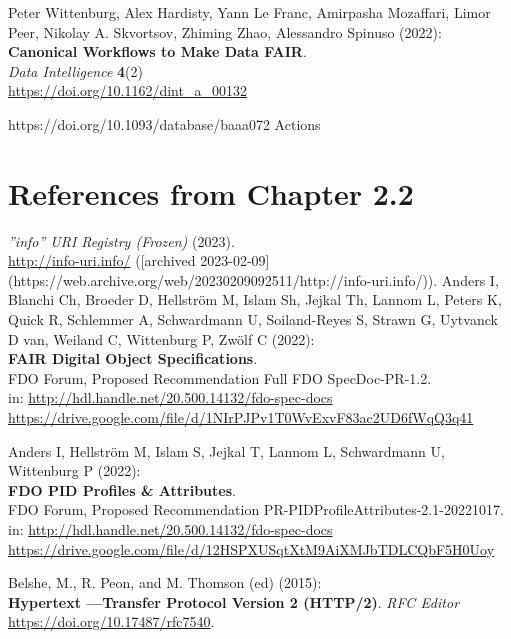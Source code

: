 \begin{thebibliography}{9}
Peter Wittenburg, Alex Hardisty, Yann Le Franc, Amirpasha Mozaffari, Limor Peer, Nikolay A. Skvortsov, Zhiming Zhao, Alessandro Spinuso (2022):\\
\textbf{Canonical Workflows to Make Data FAIR}.\\
\emph{Data Intelligence} \textbf{4}(2)\\
\url{https://doi.org/10.1162/dint_a_00132}


https://doi.org/10.1093/database/baaa072 Actions







\section{References from Chapter 2.2}

\emph{”info” URI Registry (Frozen)} (2023).  \\
\url{http://info-uri.info/} ([archived 2023-02-09](https://web.archive.org/web/20230209092511/http://info-uri.info/)).
{}
Anders I, Blanchi Ch, Broeder D, Hellström M, Islam Sh, Jejkal Th, Lannom L, Peters K, Quick R, Schlemmer A, Schwardmann U, Soiland-Reyes S, Strawn G, Uytvanck D van, Weiland C, Wittenburg P, Zwölf C (2022):\\
\textbf{FAIR Digital Object Specifications}.\\
FDO Forum, Proposed Recommendation Full FDO SpecDoc-PR-1.2. \\
in: \url{http://hdl.handle.net/20.500.14132/fdo-spec-docs}\\
\url{https://drive.google.com/file/d/1NIrPJPv1T0WvExvF83ac2UD6fWqQ3q41}

Anders I, Hellström M, Islam S, Jejkal T, Lannom L, Schwardmann U, Wittenburg P (2022):\\
\textbf{FDO PID Profiles \& Attributes}.\\
FDO Forum,  Proposed Recommendation PR-PIDProfileAttributes-2.1-20221017.
in: \url{http://hdl.handle.net/20.500.14132/fdo-spec-docs}\\
\url{https://drive.google.com/file/d/12HSPXUSqtXtM9AiXMJbTDLCQbF5H0Uoy}


Belshe, M., R. Peon, and M. Thomson (ed) (2015):\\
\textbf{Hypertext ––Transfer Protocol Version 2 (HTTP/2)}. 
\emph{RFC Editor}
\url{https://doi.org/10.17487/rfc7540}.


\end{thebibliography}
